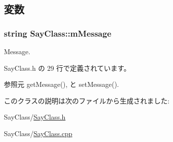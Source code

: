 \subsection{変数}
\hypertarget{classSayClass_ae8e574040647db1b0f289f3aec5566ee}{
\subsubsection[{m\-Message}]{\setlength{\rightskip}{0pt plus 5cm}string {\bf \-Say\-Class\-::m\-Message}}}\label{classSayClass_ae8e574040647db1b0f289f3aec5566ee}


\-Message. 



 \-Say\-Class.\-h の 29 行で定義されています。



参照元 get\-Message(), と set\-Message().



このクラスの説明は次のファイルから生成されました\-:\begin{DoxyCompactItemize}
\item 
\-Say\-Class/\hyperlink{SayClass_8h}{\-Say\-Class.\-h}\item 
\-Say\-Class/\hyperlink{SayClass_8cpp}{\-Say\-Class.\-cpp}\end{DoxyCompactItemize}
